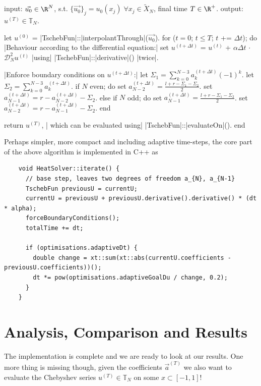 \documentclass[12pt, a4paper]{article}
\begin{document}
  \begin{algorithm}[language=pseudo,caption={\centering Our final solving algorithm}]
input: $\vec{u_0} \in \R^N$, s.t. $\{\vec{u_0}\}_j = u_0(x_j) \; \forall x_j \in \tilde{X}_N$, final time $T \in \R^+$.
output: $u^{(T)} \in \mathbb{T}_N$.

let $u^{(0)}$ = |\color{themecolor3}TschebFun|::|\color{themecolor2}interpolantThrough|($\vec{u_0}$).
for ($t = 0$; $t \le T$; $t$ += $\Delta t$); do
  |\rm\color{gray}Behaviour according to the differential equation:|
  set $u^{(t+\Delta t)}$ = $u^{(t)}$ + $\alpha \Delta t$ $\cdot$ $\mathcal{D}_N^2 u^{(t)}$ |\rm\color{gray}using| |\color{themecolor3}TschebFun|::|\color{themecolor2}derivative|() |\rm\color{gray}twice|.

  |\rm\color{gray}Enforce boundary conditions on $u^{(t+\Delta t)}$:|
  let $\Sigma_1 = \sum_{k=0}^{N-3} a_k^{(t+\Delta t)} (-1)^k$.
  let $\Sigma_2 = \sum_{k=0}^{N-3} a_k^{(t+\Delta t)}$.
  if $N$ even; do
    set $a_{N-2}^{(t+\Delta t)} = \frac{l+r-\Sigma_1-\Sigma_2}{2}$.
    set $a_{N-1}^{(t+\Delta t)} = r - a_{N-2}^{(t+\Delta t)} - \Sigma_2$.
  else if $N$ odd; do
    set $a_{N-1}^{(t+\Delta t)} = \frac{l+r-\Sigma_1-\Sigma_2}{2}$.
    set $a_{N-2}^{(t+\Delta t)} = r - a_{N-1}^{(t+\Delta t)} - \Sigma_2$.
  end

  return $u^{(T)}$, |\rm\color{gray} which can be evaluated using| |\color{themecolor3}TschebFun|::|\color{themecolor2}evaluateOn|().
end
  \end{algorithm}

  Perhaps simpler, more compact and including adaptive time-steps, the core part of the above algorithm is implemented in C++ as
  \begin{verbatim}
    void HeatSolver::iterate() {
      // base step, leaves two degrees of freedom a_{N}, a_{N-1}
      TschebFun previousU = currentU;
      currentU = previousU + previousU.derivative().derivative() * (dt * alpha);
      forceBoundaryConditions();
      totalTime += dt;

      if (optimisations.adaptiveDt) {
        double change = xt::sum(xt::abs(currentU.coefficients - previousU.coefficients))();
        dt *= pow(optimisations.adaptiveGoalDu / change, 0.2);
      }
    }
  \end{verbatim}

  \section{Analysis, Comparison and Results}
  The implementation is complete and we are ready to look at our results.
  One more thing is missing though, given the coefficients $\vec{a}^{(T)}$ we also want to evaluate the Chebyshev series $u^{(T)} \in \mathbb{T}_N$ on some $x \subset [-1, 1]$!
\end{document}
